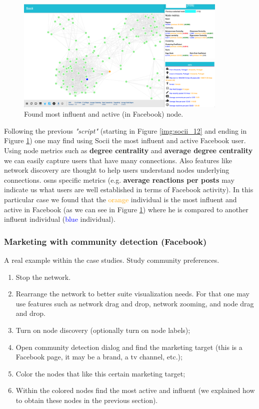 \begin{figure}[h!]
\begin{center}
  \hspace*{-0.8in}
  \includegraphics[width=0.9\textwidth]{img/socii/socii_13.png}
\end{center}
\caption{\label{img:socii_13} Found most influent and active (in Facebook) node.}
\end{figure}

\indent Following the previous \textit{"script"} (starting in Figure \ref{img:socii_12} and ending in Figure \ref{img:socii_13}) one may find using Socii the most influent and active Facebook user. Using node metrics such as \textbf{degree centrality} and \textbf{average degree centrality} we can easily capture users that have many connections. Also features like network discovery are thought to help users understand nodes underlying connections. \glspl{osn} specific metrics (e.g. \textbf{average reactions per posts} may indicate us what users are well established in terms of Facebook activity). In this particular case we found that the \textcolor{orange}{orange} individual is the most influent and active in Facebook (as we can see in Figure \ref{img:socii_13}) where he is compared to another influent individual (\textcolor{blue}{blue} individual).

\subsubsection{Marketing with community detection (Facebook)}
A real example within the case studies. Study community preferences.

\begin{enumerate}
    \item Stop the network.
    \item Rearrange the network to better suite visualization needs. For that one may use features such as network drag and drop, network zooming, and node drag and drop.
    \item Turn on node discovery (optionally turn on node labels);
    \item Open community detection dialog and find the marketing target (this is a Facebook page, it may be a brand, a tv channel, etc.);
    \item Color the nodes that like this certain marketing target;
    \item Within the colored nodes find the most active and influent (we explained how to obtain these nodes in the previous section).
\end{enumerate}

